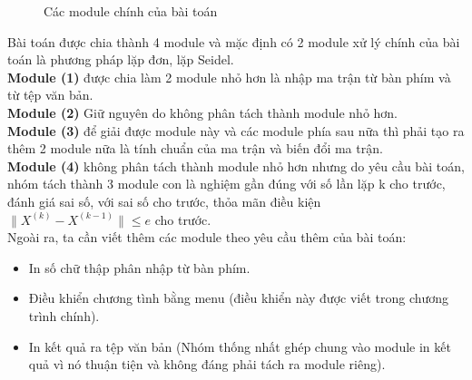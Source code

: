 \documentclass[twoside]{report2}
\begin{document}
\begin{figure}[!h]

\caption{Các module chính của bài toán}
\end{figure}

Bài toán được chia thành 4 module và mặc định có 2 module xử lý chính của bài toán là phương pháp lặp đơn, lặp Seidel.\\

\textbf{Module (1)} được chia làm 2 module nhỏ hơn là nhập ma trận từ bàn phím và từ tệp văn bản.\\

\textbf{Module (2)} Giữ nguyên do không phân tách thành module nhỏ hơn.\\

\textbf{Module (3)} để giải được module này và các module phía sau nữa thì phải tạo ra thêm 2 module nữa là tính chuẩn của ma trận và biến đổi ma trận.\\

\textbf{Module (4)} không phân tách thành module nhỏ hơn nhưng do yêu cầu bài toán, nhóm tách thành 3 module con là nghiệm gần đúng với số lần lặp k cho trước, đánh giá sai số, với sai số cho trước, thỏa mãn điều kiện $\big\| X^{(k)} - X^{(k-1)} \big\| \le e$ cho trước.\\

Ngoài ra, ta cần viết thêm các module theo yêu cầu thêm của bài toán:
\begin{itemize}
\item In số chữ thập phân nhập từ bàn phím.
\item Điều khiển chương tình bằng menu (điều khiển này được viết trong chương trình chính).
\item In kết quả ra tệp văn bản (Nhóm thống nhất ghép chung vào module in kết quả vì nó thuận tiện và không đáng phải tách ra module riêng).
\end{itemize}
\end{document}
